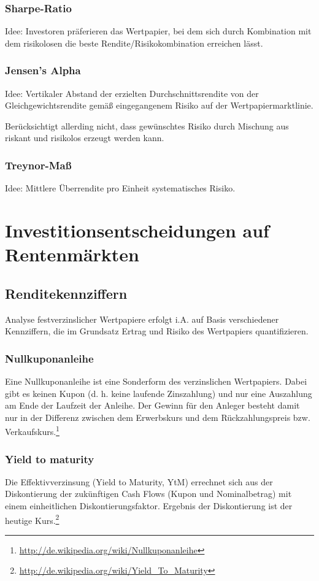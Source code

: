 \subsubsection{Sharpe-Ratio}
Idee: Investoren präferieren das Wertpapier, bei dem sich durch Kombination mit dem risikolosen die beste Rendite/Risikokombination erreichen lässt.

\subsubsection{Jensen's Alpha}
Idee: Vertikaler Abstand der erzielten Durchschnittsrendite von der Gleichgewichtsrendite gemäß eingegangenem Risiko auf der Wertpapiermarktlinie.

Berücksichtigt allerding nicht, dass gewünschtes Risiko durch Mischung aus riskant und risikolos erzeugt werden kann.

\subsubsection{Treynor-Maß}
Idee: Mittlere Überrendite pro Einheit systematisches Risiko.



\section{Investitionsentscheidungen auf Rentenmärkten}

\subsection{Renditekennziffern}
Analyse festverzinslicher Wertpapiere erfolgt i.A. auf Basis verschiedener Kennziffern, die im Grundsatz Ertrag und Risiko des Wertpapiers quantifizieren.

\subsubsection{Nullkuponanleihe}
Eine Nullkuponanleihe  ist eine Sonderform des verzinslichen Wertpapiers. Dabei gibt es keinen Kupon (d. h. keine laufende Zinszahlung) und nur eine Auszahlung am Ende der Laufzeit der Anleihe. Der Gewinn für den Anleger besteht damit nur in der Differenz zwischen dem Erwerbskurs und dem Rückzahlungspreis bzw. Verkaufskurs.\footnote{\url{http://de.wikipedia.org/wiki/Nullkuponanleihe}}

\subsubsection{Yield to maturity}
Die Effektivverzinsung (Yield to Maturity, YtM) errechnet sich aus der Diskontierung der zukünftigen Cash Flows (Kupon und Nominalbetrag) mit einem einheitlichen Diskontierungsfaktor. Ergebnis der Diskontierung ist der heutige Kurs.\footnote{\url{http://de.wikipedia.org/wiki/Yield_To_Maturity}}

